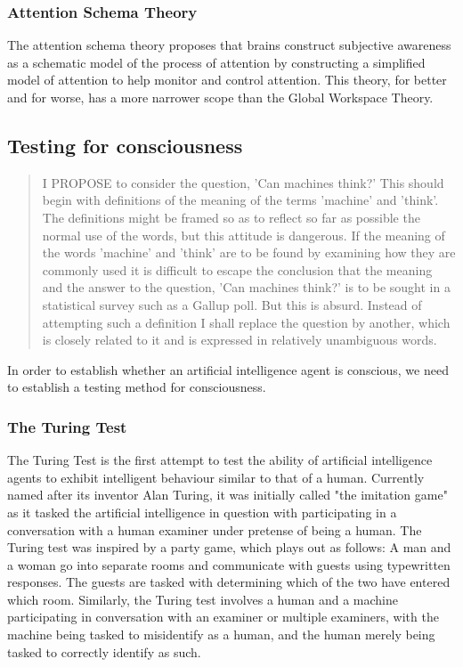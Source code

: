 \documentclass[masterthesis]{fer}
\begin{document}
\subsubsection{Attention Schema Theory}
The attention schema theory proposes that brains construct subjective awareness as a schematic model of the process of attention by constructing a simplified model of attention to help monitor and control attention.
This theory, for better and for worse, has a more narrower scope than the Global Workspace Theory.
\subsection{Testing for consciousness}
\begin{quote}
I PROPOSE to consider the question, 'Can machines think?' This should begin with definitions of the meaning of the terms 'machine' and 'think'. The definitions might be framed so as to reflect so far as possible the normal use of the words, but this attitude is dangerous. If the meaning of the words 'machine' and 'think' are to be found by examining how they are commonly used it is difficult to escape the conclusion that the meaning and the answer to the question, 'Can machines think?' is to be sought in a statistical survey such as a Gallup poll. But this is absurd. Instead of attempting such a definition I shall replace the question by another, which is closely related to it and is expressed in relatively unambiguous words. 
\end{quote}
In order to establish whether an artificial intelligence agent is conscious, we need to establish a testing method for consciousness.

\subsubsection{The Turing Test}
The Turing Test is the first attempt to test the ability of artificial intelligence agents to exhibit intelligent behaviour similar to that of a human.
Currently named after its inventor Alan Turing, it was initially called "the imitation game" as it tasked the artificial intelligence in question with participating in a conversation with a human examiner under pretense of being a human.
The Turing test was inspired by a party game, which plays out as follows: A man and a woman go into separate rooms and communicate with guests using typewritten responses. The guests are tasked with determining which of the two have entered which room.
Similarly, the Turing test involves a human and a machine participating in conversation with an examiner or multiple examiners, with the machine being tasked to misidentify as a human, and the human merely being tasked to correctly identify as such.
\end{document}

